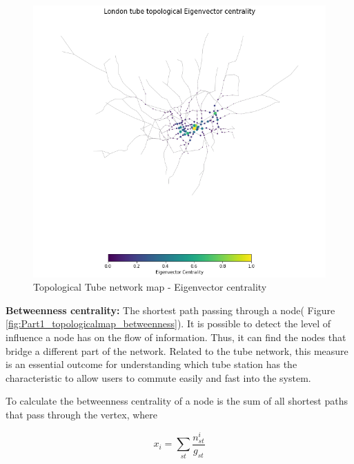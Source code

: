 \documentclass[10pt]{report}
\numberwithin{figure}{section}
\numberwithin{table}{section}
\begin{document}
        
    \begin{figure}[htp]
        \centering
        \includegraphics[width=14cm]{Image/Part1_topologicalmap_eigenvector.png}
        \caption{Topological Tube network map - Eigenvector centrality}
        \label{fig:Part1_topologicalmap_eigenvector}
    \end{figure} 

  
\newpage   
        \textbf{Betweenness centrality:} The shortest path passing through a node( Figure \ref{fig:Part1_topologicalmap_betweenness}). It is possible to detect the level of influence a node has on the flow of information. Thus, it can find the nodes that bridge a different part of the network. Related to the tube network, this measure is an essential outcome for understanding which tube station has the characteristic to allow users to commute easily and fast into the system.
        
        To calculate the betweenness centrality of a node is the sum of all shortest paths that pass through the vertex, where 
                    

\begin{equation}x_{i}=\sum_{st} \frac {n^{i}_{st}}{g_{st}}\end{equation}
        
\end{document}
